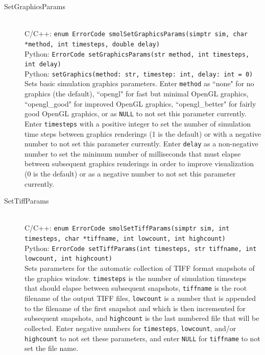 \documentclass {scrbook}
\newcommand {\ttt} {\texttt}
\begin{document}
\begin{description}

\item[SetGraphicsParams]
\hfill \\
C/C++: \ttt{enum ErrorCode smolSetGraphicsParams(simptr sim, char *method, int timesteps, double delay)}\\
Python: \ttt{ErrorCode setGraphicsParams(str method, int timesteps, int delay)}\\
Python: \ttt{setGraphics(method: str, timestep: int, delay: int = 0)}\\
Sets basic simulation graphics parameters. Enter \ttt{method} as ``none" for no graphics (the default), ``opengl" for fast but minimal OpenGL graphics, ``opengl\_good" for improved OpenGL graphics, ``opengl\_better" for fairly good OpenGL graphics, or as \ttt{NULL} to not set this parameter currently. Enter \ttt{timesteps} with a positive integer to set the number of simulation time steps between graphics renderings (1 is the default) or with a negative number to not set this parameter currently. Enter \ttt{delay} as a non-negative number to set the minimum number of milliseconds that must elapse between subsequent graphics renderings in order to improve visualization (0 is the default) or as a negative number to not set this parameter currently.

\item[SetTiffParams]
\hfill \\
C/C++: \ttt{enum ErrorCode smolSetTiffParams(simptr sim, int timesteps, char *tiffname, int lowcount, int highcount)}\\
Python: \ttt{ErrorCode setTiffParams(int timesteps, str tiffname, int lowcount, int highcount)}\\
Sets parameters for the automatic collection of TIFF format snapshots of the graphics window. \ttt{timesteps} is the number of simulation timesteps that should elapse between subsequent snapshots, \ttt{tiffname} is the root filename of the output TIFF files, \ttt{lowcount} is a number that is appended to the filename of the first snapshot and which is then incremented for subsequent snapshots, and \ttt{highcount} is the last numbered file that will be collected. Enter negative numbers for \ttt{timesteps}, \ttt{lowcount}, and/or \ttt{highcount} to not set these parameters, and enter \ttt{NULL} for \ttt{tiffname} to not set the file name.


\end{description}
\end{document}
